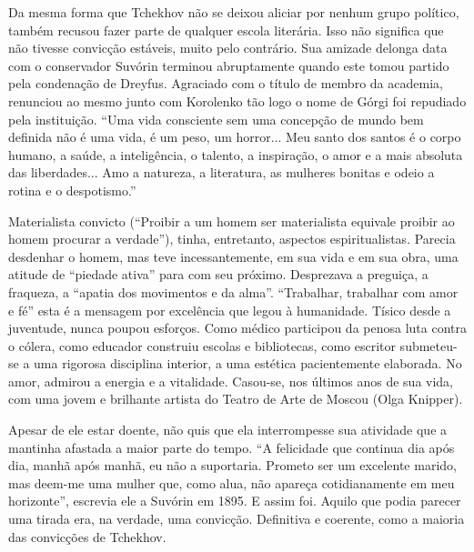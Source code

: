 Da mesma forma que Tchekhov não se deixou aliciar por nenhum grupo
político, também recusou fazer parte de qualquer escola literária. Isso
não significa que não tivesse convicção estáveis, muito pelo contrário.
Sua amizade delonga data com o conservador Suvórin terminou abruptamente
quando este tomou partido pela condenação de Dreyfus. Agraciado com o
título de membro da academia, renunciou ao mesmo junto com Korolenko tão
logo o nome de Górgi foi repudiado pela instituição. ``Uma vida
consciente sem uma concepção de mundo bem definida não é uma vida, é um
peso, um horror... Meu santo dos santos é o corpo humano, a saúde, a
inteligência, o talento, a inspiração, o amor e a mais absoluta das
liberdades... Amo a natureza, a literatura, as mulheres bonitas e odeio
a rotina e o despotismo.''

Materialista convicto (``Proibir a um homem ser materialista equivale
proibir ao homem procurar a verdade''), tinha, entretanto, aspectos
espiritualistas. Parecia desdenhar o homem, mas teve incessantemente, em
sua vida e em sua obra, uma atitude de ``piedade ativa'' para com seu
próximo. Desprezava a preguiça, a fraqueza, a ``apatia dos movimentos e
da alma''. ``Trabalhar, trabalhar com amor e fé'' esta é a mensagem por
excelência que legou à humanidade. Tísico desde a juventude, nunca
poupou esforços. Como médico participou da penosa luta contra o cólera,
como educador construiu escolas e bibliotecas, como escritor submeteu-se
a uma rigorosa disciplina interior, a uma estética pacientemente
elaborada. No amor, admirou a energia e a vitalidade. Casou-se, nos
últimos anos de sua vida, com uma jovem e brilhante artista do Teatro de
Arte de Moscou (Olga Knipper).

Apesar de ele estar doente, não quis que ela interrompesse sua atividade
que a mantinha afastada a maior parte do tempo. ``A felicidade que
continua dia após dia, manhã após manhã, eu não a suportaria. Prometo
ser um excelente marido, mas deem-me uma mulher que, como alua, não
apareça cotidianamente em meu horizonte'', escrevia ele a Suvórin em
1895. E assim foi. Aquilo que podia parecer uma tirada era, na verdade,
uma convicção. Definitiva e coerente, como a maioria das convicções de
Tchekhov.

